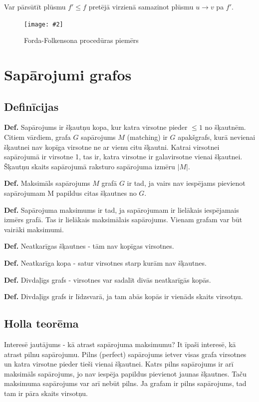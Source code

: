 \documentclass{article}
\newcommand{\illustration}[3]{
	\begin{figure}[H]
		\centering	
		\texttt{[image: \#2]}
		\caption{#3}
	\end{figure}
}
\begin{document}
Var pārsūtīt plūsmu $f' \le f$ pretējā virzienā samazinot plūsmu $u \to v$ pa $f'$.

\illustration{1}{Ford_Folkenson_proc-1}{Forda-Folkensona procedūras piemērs}

\section{Sapārojumi grafos}
\subsection{Definīcijas}

\textbf{Def.} Sapārojums ir šķautņu kopa, kur katra virsotne pieder $\le 1$ no šķautnēm. Citiem vārdiem, grafa $G$ sapārojums $M$ (matching) ir $G$ apakšgrafs, kurā nevienai šķautnei nav kopīga virsotne ne ar vienu citu šķautni. Katrai virsotnei sapārojumā ir virsotne 1, tas ir, katra virsotne ir galavirsotne vienai šķautnei. Šķautņu skaits sapārojumā raksturo sapārojuma izmēru $|M|$.

\textbf{Def.} Maksimāls sapārojums $M$ grafā $G$ ir tad, ja vairs nav iespējams pievienot sapārojumam M papildus citas šķautnes no $G$.

\textbf{Def.} Sapārojuma maksimums ir tad, ja sapārojumam ir lielākais iespējamais izmērs grafā. Tas ir lielākais maksimālais sapārojums.  Vienam grafam var būt vairāki maksimumi.

\textbf{Def.} Neatkarīgas šķautnes - tām nav kopīgas virsotnes.

\textbf{Def. } Neatkarīga kopa - satur virsotnes starp kurām nav šķautnes.

\textbf{Def.} Divdaļīgs grafs - virsotnes var sadalīt divās neatkarīgās kopās.

\textbf{Def.} Divdaļīgs grafs ir līdzsvarā, ja tam abās kopās ir vienāds skaits virsotņu.

\subsection{Holla teorēma}

Interesē jautājums - kā atrast sapārojuma maksimumu?  It īpaši interesē, kā atrast pilnu sapārojumu.  Pilns (perfect) sapārojums ietver visas grafa virsotnes un katra virsotne pieder tieši vienai šķautnei.  Katrs pilns sapārojums ir arī maksimāls sapārojums, jo nav iespēja papildus pievienot jaunas šķautnes. Taču maksimuma sapārojums var arī nebūt pilns.  Ja grafam ir pilns sapārojums, tad tam ir pāra skaits virsotņu.
\end{document}
